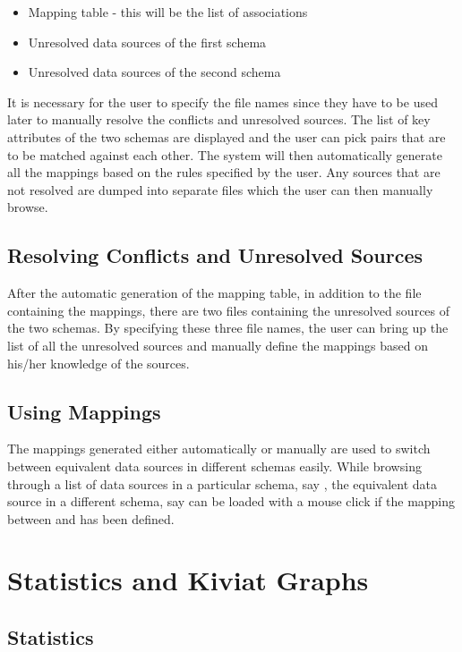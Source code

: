 \begin{itemize}
\item Mapping table - this will be the list of associations
\item Unresolved data sources of the first schema 
\item Unresolved data sources of the second schema
\end{itemize}

It is necessary for the user to specify the file names since they have
to be used later to manually resolve the conflicts and unresolved
sources. The list of key attributes of the two schemas are displayed
and the user can pick pairs that are to be matched against each other.
The system will then automatically generate all the mappings based on
the rules specified by the user.  Any sources that are not resolved
are dumped into separate files which the user can then manually
browse.

\subsection{Resolving Conflicts and Unresolved Sources}

After the automatic generation of the mapping table, in addition to
the file containing the mappings, there are two files containing the
unresolved sources of the two schemas. By specifying these three file
names, the user can bring up the list of all the unresolved sources
and manually define the mappings based on his/her knowledge of the
sources.

\subsection{Using Mappings}

The mappings generated either automatically or manually are used to
switch between equivalent data sources in different schemas
easily. While browsing through a list of data sources in a particular
schema, say , the equivalent data source in a different
schema, say  can be loaded with a mouse click if the
mapping between  and  has been defined.

\section{Statistics and Kiviat Graphs}

\subsection{Statistics}

